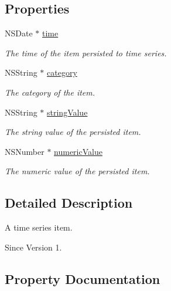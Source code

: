 \subsection*{Properties}
\begin{DoxyCompactItemize}
\item 
N\+S\+Date $\ast$ \hyperlink{interface_x_i_time_series_item_a00b8c4d50ca16e65ceb3ea37cf24faaa}{time}
\begin{DoxyCompactList}\small\item\em The time of the item persisted to time series. \end{DoxyCompactList}\item 
N\+S\+String $\ast$ \hyperlink{interface_x_i_time_series_item_a7da0efac28a8ffa94c14dbb240fdb9b2}{category}
\begin{DoxyCompactList}\small\item\em The category of the item. \end{DoxyCompactList}\item 
N\+S\+String $\ast$ \hyperlink{interface_x_i_time_series_item_aaac051a1a8024f6da2410ee2072fafa0}{string\+Value}
\begin{DoxyCompactList}\small\item\em The string value of the persisted item. \end{DoxyCompactList}\item 
N\+S\+Number $\ast$ \hyperlink{interface_x_i_time_series_item_ac7aef9ac45dd3fff659a50c77eacd25f}{numeric\+Value}
\begin{DoxyCompactList}\small\item\em The numeric value of the persisted item. \end{DoxyCompactList}\end{DoxyCompactItemize}


\subsection{Detailed Description}
A time series item. 

\begin{DoxySince}{Since}
Version 1. 
\end{DoxySince}


\subsection{Property Documentation}
\hypertarget{interface_x_i_time_series_item_a7da0efac28a8ffa94c14dbb240fdb9b2}{}\label{interface_x_i_time_series_item_a7da0efac28a8ffa94c14dbb240fdb9b2} 
